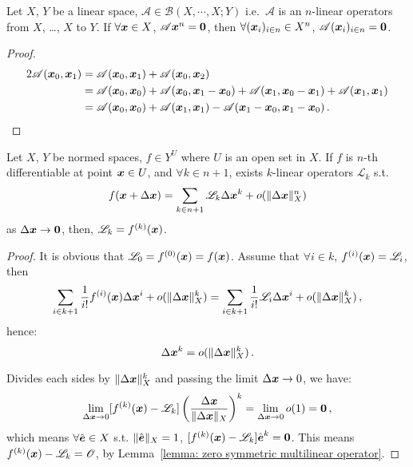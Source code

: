 \documentclass[openany]{book}
\begin{document}
\begin{lemma}
	\label{lemma: zero symmetric multilinear operator}
	Let $X$, $Y$ be a linear space, $\mathscr A \in \mathcal B(X, \cdots, X; Y)$ i.e.\ $\mathscr A$ is an $n$-linear operators from $X$, \ldots, $X$ to $Y$. 
	If $\forall \boldsymbol{x} \in X$, $\mathscr A \boldsymbol{x}^n = \boldsymbol{0}$, then $\forall (\boldsymbol{x}_i)_{i \in n} \in X^n$, $\mathscr A(\boldsymbol{x}_i)_{i \in n} = \boldsymbol{0}$.
\end{lemma}
\begin{proof}
	\begin{align*}
		2 \mathscr A(\boldsymbol{x}_0, \boldsymbol{x}_1) 
			&= \mathscr A(\boldsymbol{x}_0, \boldsymbol{x}_1) + \mathscr A(\boldsymbol{x}_0, \boldsymbol{x}_2)
		\\
			&= \mathscr A(\boldsymbol{x}_0, \boldsymbol{x}_0) + \mathscr A(\boldsymbol{x}_0, \boldsymbol{x}_1 - \boldsymbol{x}_0)
				+ \mathscr A(\boldsymbol{x}_1, \boldsymbol{x}_0 - \boldsymbol{x}_1) + \mathscr A(\boldsymbol{x}_1, \boldsymbol{x}_1)
		\\
			&= \mathscr A(\boldsymbol{x}_0, \boldsymbol{x}_0) + \mathscr A(\boldsymbol{x}_1, \boldsymbol{x}_1) - \mathscr A(\boldsymbol{x}_1 - \boldsymbol{x}_0, \boldsymbol{x}_1 - \boldsymbol{x}_0)\,.
	\end{align*}
\end{proof}

\begin{theorem}
	Let $X$, $Y$ be normed spaces, $f \in Y^U$ where $U$ is an open set in $X$.
	If $f$ is $n$-th differentiable at point $\boldsymbol{x} \in U$, and $\forall k \in n + 1$, exists $k$-linear operators $\mathscr L_k$ s.t.\ 
	\begin{equation*}
		f(\boldsymbol{x} + \Delta \boldsymbol{x}) = \sum_{k \in n+1} \mathscr L_k \Delta \boldsymbol{x}^k + o(\|\Delta \boldsymbol{x}\|_X^n)
	\end{equation*}
	as $\Delta \boldsymbol{x} \to \boldsymbol{0}$, then, $\mathscr L_k = f^{(k)}(\boldsymbol{x})$.
\end{theorem}
\begin{proof}
	It is obvious that $\mathscr L_0 = f^{(0)}(\boldsymbol{x}) = f(\boldsymbol{x})$. 
	Assume that $\forall i \in k$, $f^{(i)}(\boldsymbol{x}) = \mathscr L_i$, then
	\begin{equation*}
		\sum_{i \in k + 1} \frac{1}{i!} f^{(i)}(\boldsymbol{x})\Delta \boldsymbol{x}^i + o(\|\Delta \boldsymbol{x}\|_X^k)
		 = \sum_{i \in k + 1} \frac{1}{i!} \mathscr L_i \Delta \boldsymbol{x}^i + o(\|\Delta \boldsymbol{x}\|_X^k)\,,
	\end{equation*}
	hence:
	\begin{equation*}
		[f^{(k)}(\bv x) - \mathscr L_k]\Delta \bv x^k = o(\|\Delta \bv x\|_X^k)\,.
	\end{equation*}

	Divides each sides by $\|\Delta \boldsymbol{x}\|_X^k$ and passing the limit $\Delta \boldsymbol{x} \to 0$, we have:
	\begin{equation*}
		\lim_{\Delta \boldsymbol{x} \to 0} [f^{(k)}(\boldsymbol{x}) - \mathscr L_k] \left( 
			\frac{\Delta \boldsymbol{x}}{\|\Delta \boldsymbol{x}\|_X}
		 \right)^k = \lim_{\Delta \boldsymbol{x} \to 0} o(1) = \boldsymbol{0}\,,
	\end{equation*}
	which means $\forall \hat{\boldsymbol{e}} \in X$ s.t. $\|\hat{\boldsymbol{e}}\|_X = 1$, $[f^{(k)}(\boldsymbol{x}) - \mathscr L_k] \hat{\boldsymbol{e}}^k = \boldsymbol{0}$. This means $f^{(k)}(\boldsymbol{x}) - \mathscr L_k = \mathscr O$, by Lemma~\ref{lemma: zero symmetric multilinear operator}.
\end{proof}
\end{document}
